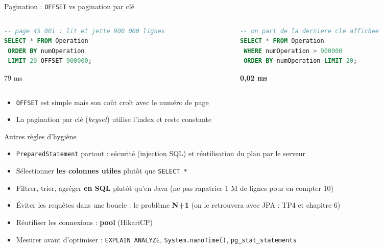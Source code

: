 \documentclass[aspectratio=169,10pt]{beamer}
\begin{document}
\begin{frame}[fragile]{Pagination : \texttt{OFFSET} vs pagination par cl\'e}
  \begin{columns}[T]
    \begin{column}{0.48\textwidth}
\begin{lstlisting}[language=SQL]
-- page 45 001 : lit et jette 900 000 lignes
SELECT * FROM Operation
 ORDER BY numOperation
 LIMIT 20 OFFSET 900000;
\end{lstlisting}
      \centering\alert{79 ms}
    \end{column}
    \begin{column}{0.48\textwidth}
\begin{lstlisting}[language=SQL]
-- on part de la derniere cle affichee
SELECT * FROM Operation
 WHERE numOperation > 900000
 ORDER BY numOperation LIMIT 20;
\end{lstlisting}
      \centering\textbf{0,02 ms}
    \end{column}
  \end{columns}
  \vspace{3mm}
  \begin{itemize}
    \item \texttt{OFFSET} est simple mais son co\^ut cro\^it avec le num\'ero de page
    \item La pagination par cl\'e (\textit{keyset}) utilise l'index et reste constante
  \end{itemize}
\end{frame}

\begin{frame}{Autres r\`egles d'hygi\`ene}
  \begin{itemize}
    \item \texttt{PreparedStatement} partout : s\'ecurit\'e (injection SQL) et r\'eutilisation du plan par le serveur
    \item S\'electionner \textbf{les colonnes utiles} plut\^ot que \texttt{SELECT *}
    \item Filtrer, trier, agr\'eger \textbf{en SQL} plut\^ot qu'en Java (ne pas rapatrier 1 M de lignes pour en compter 10)
    \item \'Eviter les requ\^etes dans une boucle : le probl\`eme \og \textbf{N+1} \fg{} (on le retrouvera avec JPA : TP4 et chapitre 6)
    \item R\'eutiliser les connexions : \textbf{pool} (HikariCP)
    \item Mesurer avant d'optimiser : \texttt{EXPLAIN ANALYZE}, \texttt{System.nanoTime()}, \texttt{pg\_stat\_statements}
  \end{itemize}
\end{frame}

\rquestionslide
\end{document}
